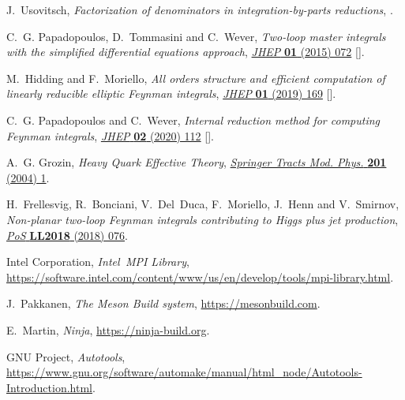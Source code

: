 \documentclass[11pt,a4paper,DIV=11,numbers=noenddot,parskip=half]{scrartcl}
\begin{document}
\begin{thebibliography}{10}
J.~Usovitsch, \emph{{Factorization of denominators in integration-by-parts
  reductions}},  \href{https://arxiv.org/abs/2002.08173}{{}}.

C.~G. Papadopoulos, D.~Tommasini and C.~Wever, \emph{{Two-loop master integrals
  with the simplified differential equations approach}},
  \href{https://doi.org/10.1007/JHEP01(2015)072}{\emph{JHEP} {\bfseries 01}
  (2015) 072} [\href{https://arxiv.org/abs/1409.6114}{{}}].

M.~Hidding and F.~Moriello, \emph{{All orders structure and efficient
  computation of linearly reducible elliptic Feynman integrals}},
  \href{https://doi.org/10.1007/JHEP01(2019)169}{\emph{JHEP} {\bfseries 01}
  (2019) 169} [\href{https://arxiv.org/abs/1712.04441}{{}}].

C.~G. Papadopoulos and C.~Wever, \emph{{Internal reduction method for computing
  Feynman integrals}},
  \href{https://doi.org/10.1007/JHEP02(2020)112}{\emph{JHEP} {\bfseries 02}
  (2020) 112} [\href{https://arxiv.org/abs/1910.06275}{{}}].

A.~G. Grozin, \emph{{Heavy Quark Effective Theory}},
  \href{https://doi.org/10.1007/b79301}{\emph{Springer Tracts Mod. Phys.}
  {\bfseries 201} (2004) 1}.

H.~Frellesvig, R.~Bonciani, V.~Del~Duca, F.~Moriello, J.~Henn and V.~Smirnov,
  \emph{{Non-planar two-loop Feynman integrals contributing to Higgs plus jet
  production}}, \href{https://doi.org/10.22323/1.303.0076}{\emph{PoS}
  {\bfseries LL2018} (2018) 076}.

{Intel Corporation}, \emph{{Intel\,\textsuperscript{\textregistered} MPI
  Library}},
  \href{https://software.intel.com/content/www/us/en/develop/tools/mpi-library.html}{https://software.intel.com/content/www/us/en/develop/tools/mpi-library.html}.

J.~Pakkanen, \emph{{The Meson Build system}},
  \href{https://mesonbuild.com}{https://mesonbuild.com}.

E.~Martin, \emph{{Ninja}},
  \href{https://ninja-build.org}{https://ninja-build.org}.

{GNU Project}, \emph{{Autotools}},
  \href{https://www.gnu.org/software/automake/manual/html\_node/Autotools-Introduction.html}{https://www.gnu.org/software/automake/manual/html\_node/Autotools-Introduction.html}.


\end{thebibliography}
\end{document}
